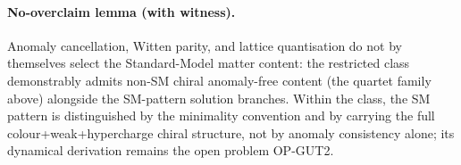 \paragraph{No-overclaim lemma (with witness).}
Anomaly cancellation, Witten parity, and lattice quantisation do
not by themselves select the Standard-Model matter content: the
restricted class demonstrably admits non-SM chiral anomaly-free
content (the quartet family above) alongside the SM-pattern
solution branches.
Within the class, the SM pattern is distinguished by the
minimality convention and by carrying the full
colour{+}weak{+}hypercharge chiral structure, not by anomaly
consistency alone; its dynamical derivation remains the open
problem OP-GUT2.


